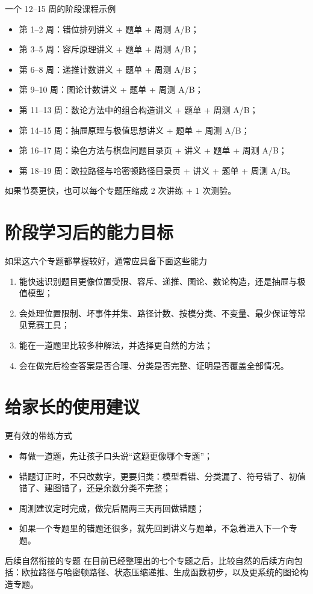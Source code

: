 \documentclass[11pt,a4paper,fontset=fandol]{ctexart}
\begin{document}
\begin{infobox}{一个 12--15 周的阶段课程示例}
\begin{itemize}
  \item 第 1--2 周：错位排列讲义 + 题单 + 周测 A/B；
  \item 第 3--5 周：容斥原理讲义 + 题单 + 周测 A/B；
  \item 第 6--8 周：递推计数讲义 + 题单 + 周测 A/B；
  \item 第 9--10 周：图论计数讲义 + 题单 + 周测 A/B；
  \item 第 11--13 周：数论方法中的组合构造讲义 + 题单 + 周测 A/B；
  \item 第 14--15 周：抽屉原理与极值思想讲义 + 题单 + 周测 A/B；
  \item 第 16--17 周：染色方法与棋盘问题目录页 + 讲义 + 题单 + 周测 A/B；
  \item 第 18--19 周：欧拉路径与哈密顿路径目录页 + 讲义 + 题单 + 周测 A/B。
\end{itemize}
如果节奏更快，也可以每个专题压缩成 2 次讲练 + 1 次测验。
\end{infobox}

\section{阶段学习后的能力目标}

\begin{goalbox}{如果这六个专题都掌握较好，通常应具备下面这些能力}
\begin{enumerate}
  \item 能快速识别题目更像位置受限、容斥、递推、图论、数论构造，还是抽屉与极值模型；
  \item 会处理位置限制、坏事件并集、路径计数、按模分类、不变量、最少保证等常见竞赛工具；
  \item 能在一道题里比较多种解法，并选择更自然的方法；
  \item 会在做完后检查答案是否合理、分类是否完整、证明是否覆盖全部情况。
\end{enumerate}
\end{goalbox}

\section{给家长的使用建议}

\begin{warnbox}{更有效的带练方式}
\begin{itemize}
  \item 每做一道题，先让孩子口头说“这题更像哪个专题”；
  \item 错题订正时，不只改数字，更要归类：模型看错、分类漏了、符号错了、初值错了、建图错了，还是余数分类不完整；
  \item 周测建议定时完成，做完后隔两三天再回做错题；
  \item 如果一个专题里的错题还很多，就先回到讲义与题单，不急着进入下一个专题。
\end{itemize}
\end{warnbox}

\begin{infobox}{后续自然衔接的专题}
在目前已经整理出的七个专题之后，比较自然的后续方向包括：欧拉路径与哈密顿路径、状态压缩递推、生成函数初步，以及更系统的图论构造专题。
\end{infobox}
\end{document}
